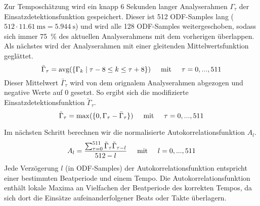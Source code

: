 {{{			%
			Zur Temposchätzung wird ein knapp \num{6} Sekunden langer Analyserahmen $\Gamma_\tau$ der Einsatzdetektionsfunktion gespeichert.
			Dieser ist \num{512} ODF-Samples lang ($512 \cdot \SI{11.61}{\milli\second} = \SI{5.944}{\second} $)
				und wird alle \num{128} ODF-Samples weitergeschoben,
				sodass sich immer \SI{75}{\percent} des aktuellen Analyserahmens mit dem vorherigen überlappen.
			Als nächstes wird der Analyserahmen mit einer gleitenden Mittelwertsfunktion geglättet.
			\begin{equation}
				\bar{\Gamma}_\tau = \text{avg}(\{\Gamma_k \mid \tau - 8 \leq k \leq \tau + 8 \})
				\text{\hspace{5mm}mit\hspace{5mm}} \tau = 0, ..., 511
			\end{equation}
			Dieser Mittelwert $\bar{\Gamma}_\tau$ wird von dem orignalem Analyserahmen abgezogen und negative Werte auf 0 gesetzt.
			So ergibt sich die modifizierte Einsatzdetektionsfunktion $\tilde{\Gamma}_\tau$.
			\begin{equation}
				\tilde{\Gamma}_\tau = \max(\{0, \Gamma_\tau - \bar{\Gamma}_\tau\})
				\text{\hspace{5mm}mit\hspace{5mm}} \tau = 0, ..., 511
			\end{equation}

			Im nächsten Schritt berechnen wir die normalisierte Autokorrelationsfunktion $A_l$.
			\begin{equation}
				A_l = \frac{\sum_{\tau = 0}^{511} \tilde{\Gamma}_\tau \tilde{\Gamma}_{\tau - l}}{512 - l}
				\text{\hspace{5mm}mit\hspace{5mm}} l = 0, ..., 511
			\end{equation}
			Jede Verzögerung $l$ (in ODF-Samples) der Autokorrelationsfunktion entspricht einer bestimmten Beatperiode und einem Tempo.
			Die Autokorrelationsfunktion enthält lokale Maxima an Vielfachen der Beatperiode des korrekten Tempos,
				da sich dort die Einsätze aufeinanderfolgener Beats oder Takte überlagern.

}}}
